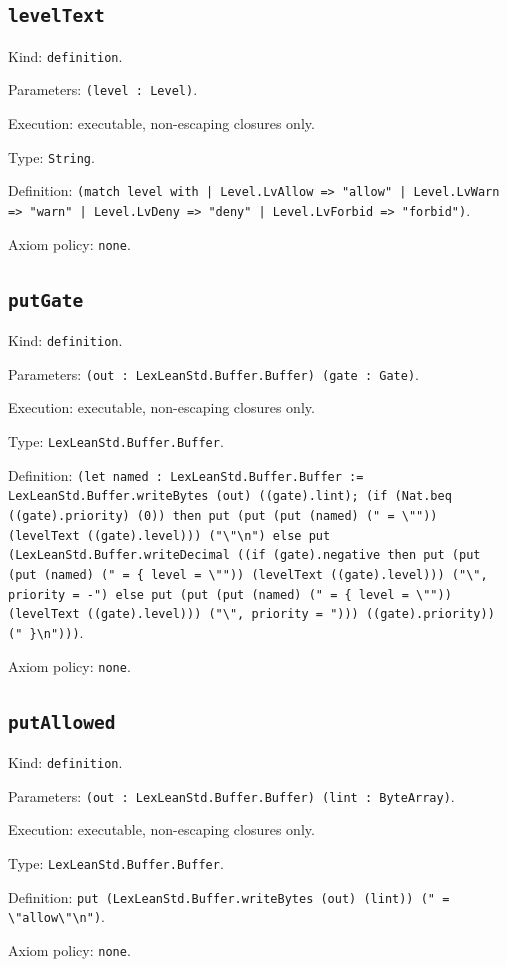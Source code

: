 \documentclass[11pt]{article}
\begin{document}
\subsection*{\texttt{levelText}}
\noindent Kind: \texttt{definition}.\par
\noindent Parameters: \texttt{(level : Level)}.\par
\noindent Execution: executable, non-escaping closures only.\par
\noindent Type: \texttt{String}.\par
\noindent Definition: \texttt{(match level with | Level.LvAllow => "allow" | Level.LvWarn => "warn" | Level.LvDeny => "deny" | Level.LvForbid => "forbid")}.\par
\noindent Axiom policy: \texttt{none}.\par
\subsection*{\texttt{putGate}}
\noindent Kind: \texttt{definition}.\par
\noindent Parameters: \texttt{(out : LexLeanStd.Buffer.Buffer) (gate : Gate)}.\par
\noindent Execution: executable, non-escaping closures only.\par
\noindent Type: \texttt{LexLeanStd.Buffer.Buffer}.\par
\noindent Definition: \texttt{(let named : LexLeanStd.Buffer.Buffer := LexLeanStd.Buffer.writeBytes (out) ((gate).lint); (if (Nat.beq ((gate).priority) (0)) then put (put (put (named) (" = \textbackslash{}"")) (levelText ((gate).level))) ("\textbackslash{}"\textbackslash{}n") else put (LexLeanStd.Buffer.writeDecimal ((if (gate).negative then put (put (put (named) (" = \{ level = \textbackslash{}"")) (levelText ((gate).level))) ("\textbackslash{}", priority = -") else put (put (put (named) (" = \{ level = \textbackslash{}"")) (levelText ((gate).level))) ("\textbackslash{}", priority = "))) ((gate).priority)) (" \}\textbackslash{}n")))}.\par
\noindent Axiom policy: \texttt{none}.\par
\subsection*{\texttt{putAllowed}}
\noindent Kind: \texttt{definition}.\par
\noindent Parameters: \texttt{(out : LexLeanStd.Buffer.Buffer) (lint : ByteArray)}.\par
\noindent Execution: executable, non-escaping closures only.\par
\noindent Type: \texttt{LexLeanStd.Buffer.Buffer}.\par
\noindent Definition: \texttt{put (LexLeanStd.Buffer.writeBytes (out) (lint)) (" = \textbackslash{}"allow\textbackslash{}"\textbackslash{}n")}.\par
\noindent Axiom policy: \texttt{none}.\par
\end{document}
